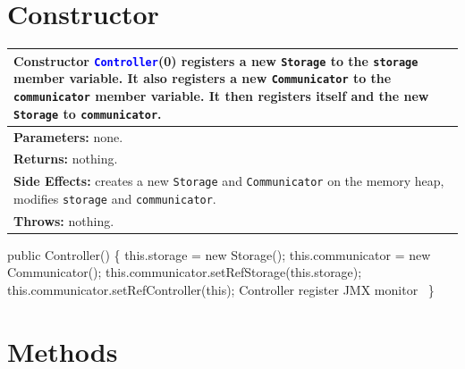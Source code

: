 \section{Constructor}
\begin{tabular}{p{\textwidth}}
\toprule
\rowcolor{TableTitle}
Constructor \textcolor{blue}{{\tt{}Controller}}(0) registers a new {\tt{}Storage} to
the {\tt{}storage} member variable. It also registers a new {\tt{}Communicator} to
the {\tt{}communicator} member variable. It then registers itself and the new
{\tt{}Storage} to {\tt{}communicator}.\\
\midrule
\textbf{Parameters:} none.\\
\textbf{Returns:} nothing.\\
\textbf{Side Effects:} creates a new {\tt{}Storage} and {\tt{}Communicator} on the
memory heap, modifies {\tt{}storage} and {\tt{}communicator}.\\
\textbf{Throws:} nothing.\\
\bottomrule
\end{tabular}
\nwenddocs{}\endmoddef{}
public Controller() \{
  this.storage = new Storage();
  this.communicator = new Communicator();
  this.communicator.setRefStorage(this.storage);
  this.communicator.setRefController(this);
  \LA{}\code{}Controller\edoc{} register JMX monitor~{\nwtagstyle{}}\RA{}
\}
\nwendcode{}\nwdocspar

\section{Methods}

